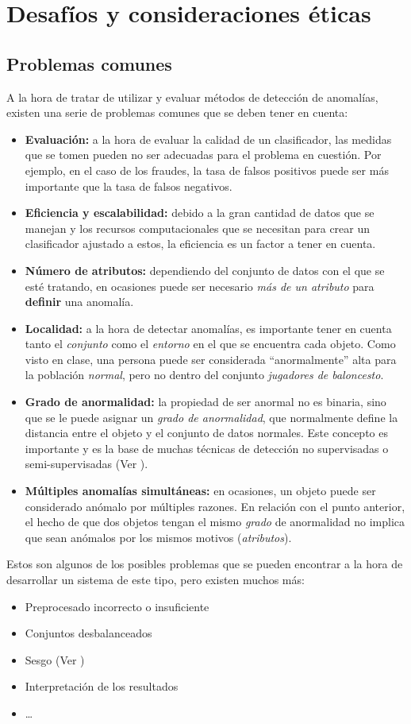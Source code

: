 \chapter{Desafíos y consideraciones éticas}
\section{Problemas comunes}
A la hora de tratar de utilizar y evaluar métodos de detección de anomalías, existen una
serie de problemas comunes que se deben tener en cuenta:

\begin{itemize}[topsep=0pt]
	\item \textbf{Evaluación:} a la hora de evaluar la calidad de un clasificador, las medidas que se tomen
		pueden no ser adecuadas para el problema en cuestión. Por ejemplo, en el caso de los fraudes,
		la tasa de falsos positivos puede ser más importante que la tasa de falsos negativos.
	\item \textbf{Eficiencia y escalabilidad:} debido a la gran cantidad de datos que se manejan y los
		recursos computacionales que se necesitan para crear un clasificador ajustado a estos, la eficiencia
		es un factor a tener en cuenta.
	\item \textbf{Número de atributos:} dependiendo del conjunto de datos con el que se esté tratando, en
		ocasiones puede ser necesario \emph{más de un atributo} para \textbf{definir} una anomalía.
	\item \textbf{Localidad:} a la hora de detectar anomalías, es importante tener en cuenta tanto el
		\emph{conjunto} como el \emph{entorno} en el que se encuentra cada objeto. Como visto en clase,
		una persona puede ser considerada ``anormalmente'' alta para la población \textit{normal},
		pero no dentro del conjunto \textit{jugadores de baloncesto}.
	\item \textbf{Grado de anormalidad:} la propiedad de ser anormal no es binaria, sino que se le puede
		asignar un \emph{grado de anormalidad}, que normalmente define la distancia entre el objeto y el
		conjunto de datos normales. Este concepto es importante y es la base de muchas técnicas de detección
		no supervisadas o semi-supervisadas (Ver ).
	\item \textbf{Múltiples anomalías simultáneas:} en ocasiones, un objeto puede ser considerado anómalo
		por múltiples razones. En relación con el punto anterior, el hecho de que dos objetos tengan el mismo
		\textit{grado} de anormalidad no implica que sean anómalos por los mismos motivos (\textit{atributos}).
\end{itemize}
\newpage{}
Estos son algunos de los posibles problemas que se pueden encontrar a la hora de desarrollar un sistema de
este tipo, pero existen muchos más:
\begin{itemize}
	\item Preprocesado incorrecto o insuficiente
	\item Conjuntos desbalanceados
	\item Sesgo (Ver )
	\item Interpretación de los resultados
	\item \ldots
\end{itemize}

